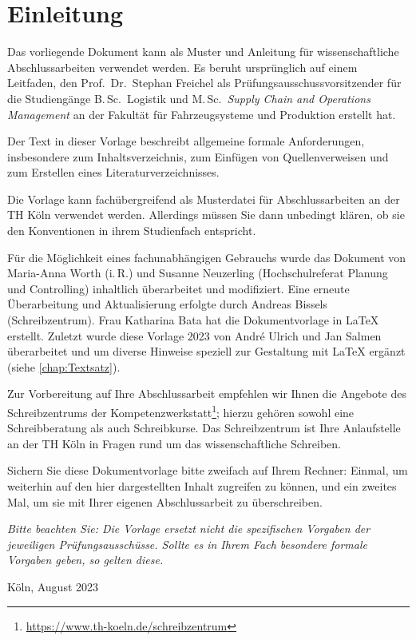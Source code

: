\chapter{Einleitung}
%
Das vorliegende Dokument kann als Muster und Anleitung für wissenschaftliche Abschlussarbeiten verwendet werden. Es beruht ursprünglich auf einem Leitfaden, den Prof.~Dr.~Stephan Freichel als Prüfungsausschussvorsitzender für die Studiengänge B.\,Sc.~Logistik und M.\,Sc.~\emph{Supply Chain and Operations Management} an der Fakultät für Fahrzeugsysteme und Produktion erstellt hat.
\par
Der Text in dieser Vorlage beschreibt allgemeine formale Anforderungen, insbesondere zum Inhaltsverzeichnis, zum Einfügen von Quellenverweisen und zum Erstellen eines Literaturverzeichnisses.
\par
Die Vorlage kann fachübergreifend als Musterdatei für Abschlussarbeiten an der TH Köln verwendet werden. Allerdings müssen Sie dann unbedingt klären, ob sie den Konventionen in ihrem Studienfach entspricht.
\par
Für die Möglichkeit eines fachunabhängigen Gebrauchs wurde das Dokument von Maria-Anna Worth (i.\,R.) und Susanne Neuzerling (Hochschulreferat Planung und Controlling) inhaltlich überarbeitet und modifiziert. Eine erneute Überarbeitung und Aktualisierung erfolgte durch Andreas Bissels (Schreibzentrum). Frau Katharina Bata hat die Dokumentvorlage in LaTeX erstellt. Zuletzt wurde diese Vorlage 2023 von André Ulrich und Jan Salmen überarbeitet und um diverse Hinweise speziell zur Gestaltung mit \LaTeX{} ergänzt (siehe \cref{chap:Textsatz}).
\par
Zur Vorbereitung auf Ihre Abschlussarbeit empfehlen wir Ihnen die Angebote des Schreibzentrums der Kompetenzwerkstatt\footnote{\href{https://www.th-koeln.de/schreibzentrum}{https://www.th-koeln.de/schreibzentrum}}; hierzu gehören sowohl eine Schreibberatung als auch Schreibkurse. Das Schreibzentrum ist Ihre Anlaufstelle an der TH Köln in Fragen rund um das wissenschaftliche Schreiben.
\par
Sichern Sie diese Dokumentvorlage bitte zweifach auf Ihrem Rechner: Einmal, um weiterhin auf den hier dargestellten Inhalt zugreifen zu können, und ein zweites Mal, um sie mit Ihrer eigenen Abschlussarbeit zu überschreiben.
\par
\emph{Bitte beachten Sie: Die Vorlage ersetzt nicht die spezifischen Vorgaben der jeweiligen Prüfungsausschüsse. Sollte es in Ihrem Fach besondere formale Vorgaben geben, so gelten diese.}\enlargethispage{\baselineskip}
%
\begin{flushright}
Köln, August 2023
\end{flushright}